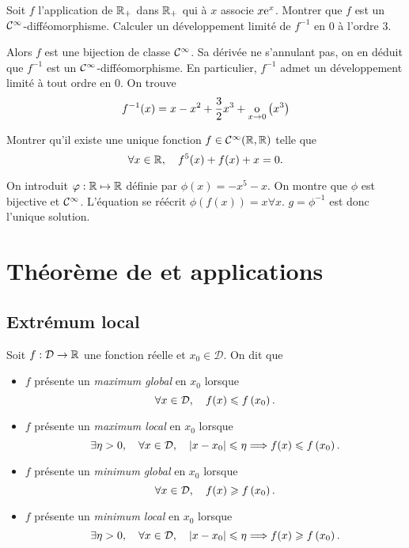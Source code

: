 \documentclass{magnoliaold}
\begin{document}
\begin{exos}
\exo Soit $f$ l'application de $\mathbb{R}_+$ dans $\mathbb{R}_+$ qui à $x$ associe $x{\rm e}^x$. Montrer que $f$ est un
  $\mathcal{C}^{\infty}$-difféomorphisme. Calculer un développement limité de $f^{-1}$ en 0 à l'ordre 3.
  \begin{sol}
  Alors $f$ est une bijection de classe $\mathcal{C}^{\infty}$.
  Sa dérivée ne s'annulant pas, on en déduit que $f^{-1}$ est un
  $\mathcal{C}^{\infty}$-difféomorphisme. En particulier,  $f^{-1}$ admet un
  développement limité à tout ordre en 0. On trouve
  \[f^{-1}(x)=x-x^2+\frac{3}{2}x^3+\underset{x \rightarrow 0}{\text{o}}\left(x^3\right)\]    
  \end{sol}
\exo Montrer qu'il existe une unique fonction $f\in\mathcal{C}^{\infty}(\mathbb{R},\mathbb{R})$
  telle que
  \[\forall x\in\mathbb{R} ,\quad f^5(x)+f(x)+x=0.\]
  \begin{sol}
    On introduit $\varphi:\mathbb{R}\mapsto\mathbb{R}$ définie par $\phi(x)=-x^5-x$. On montre que $\phi$ est bijective et $\mathcal{C}^{\infty}$. L'équation se réécrit $\phi(f(x))=x \forall x$. $g=\phi^{-1}$ est donc l'unique solution.
    \end{sol}
\end{exos}



\section{Théorème de  et applications}
\subsection{Extrémum local}
\begin{definition}[utile=-3]
Soit $f:\mathcal{D}\to\mathbb{R}$ une fonction réelle et $x_0\in\mathcal{D}$. On dit que
\begin{itemize}
\item $f$ présente un \emph{maximum global} en $x_0$ lorsque
  \[\forall x\in\mathcal{D} ,\quad f(x)\leqslant f\left(x_0\right).\]
\item $f$ présente un \emph{maximum local} en $x_0$ lorsque
  \[\exists \eta>0 ,\quad \forall x\in\mathcal{D} ,\quad
    \left|x-x_0\right|\leqslant\eta \Longrightarrow f(x)\leqslant f\left(x_0\right).\]
\item $f$ présente un \emph{minimum global} en $x_0$ lorsque
  \[\forall x\in\mathcal{D} ,\quad f(x)\geqslant f\left(x_0\right).\]
\item $f$ présente un \emph{minimum local} en $x_0$ lorsque
  \[\exists \eta>0 ,\quad \forall x\in\mathcal{D} ,\quad
    \left|x-x_0\right|\leqslant\eta \Longrightarrow f(x)\geqslant f\left(x_0\right).\]
\end{itemize}
\end{definition}
\end{document}

